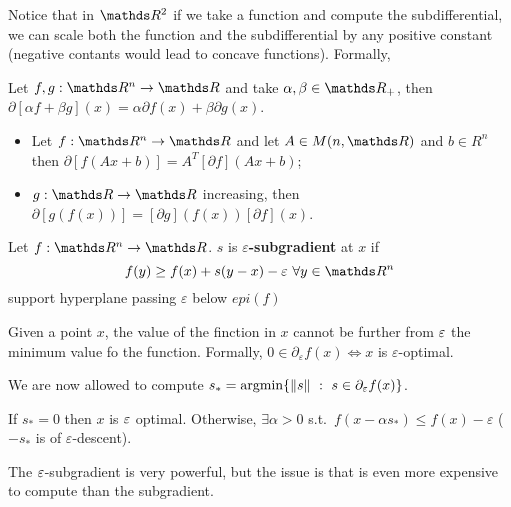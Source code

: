 \documentclass[computational_mathematics.tex]{subfiles}
\begin{document}
Notice that in $\R^2$ if we take a function and compute the subdifferential, we can scale both the function and the subdifferential by any positive constant (negative contants would lead to concave functions). Formally,

\begin{proposition}
Let $f,g: \R^n \to \R$ and take $\alpha, \beta \in \R_+$, then $\partial [\alpha f + \beta g](x) = \alpha \partial f(x) + \beta \partial g(x)$.
\end{proposition}

\begin{proposition}
  \begin{itemize}
    \item Let $f: \R^n \to \R$ and let $A \in M(n, \R)$ and $b \in R^n$ then $\partial [f(Ax + b)] = A^T [\partial f](Ax + b) $;
    \item $g:\R \to \R$ increasing, then $\partial [g(f(x))] = [\partial g](f(x)) [\partial f](x)$.
  \end{itemize}
\end{proposition}

\begin{definition}
  Let $f: \R^n \to \R$. $s$ is $\varepsilon$\textbf{-subgradient} at $x$ if 
\[
  f(y) \geq f(x) + s (y - x) - \varepsilon~ \forall y \in \R^n
\]
support hyperplane passing $\varepsilon$ below $epi(f)$
\end{definition}

\begin{proposition}
Given a point $x$, the value of the finction in $x$ cannot be further from $\varepsilon$ the minimum value fo the function.
  Formally, $0 \in \partial_\varepsilon f(x) \iff x$ is $\varepsilon$-optimal. 
\end{proposition}

We are now allowed to compute $s_* = \mbox{argmin} \{\left\lVert s\right\rVert~:~ s \in \partial_\varepsilon f(x)\}$.

If $s_* = 0$ then $x$ is $\varepsilon$ optimal. Otherwise, $\exists \alpha > 0$ s.t.~$f(x - \alpha s_*) \leq f(x) - \varepsilon$ ($- s_*$ is of $\varepsilon$-descent).

The $\varepsilon$-subgradient is very powerful, but the issue is that is even more expensive to compute than the subgradient.
\end{document}
